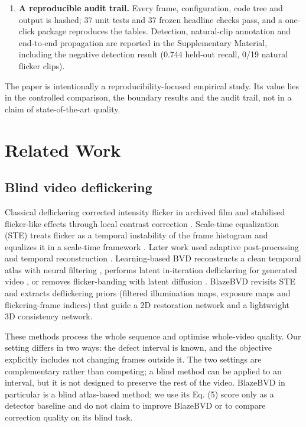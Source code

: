\documentclass[twocolumn,10pt]{svjour3}
\begin{document}
\begin{enumerate}
\item \textbf{A reproducible audit trail.} Every frame, configuration, code tree and output is hashed; 37 unit tests and 37 frozen headline checks pass, and a one-click package reproduces the tables. Detection, natural-clip annotation and end-to-end propagation are reported in the Supplementary Material, including the negative detection result (0.744 held-out recall, 0/19 natural flicker clips).
\end{enumerate}

The paper is intentionally a reproducibility-focused empirical study. Its value lies in the controlled comparison, the boundary results and the audit trail, not in a claim of state-of-the-art quality.


\section{Related Work}

\subsection{Blind video deflickering}

Classical deflickering corrected intensity flicker in archived film \cite{vanroosmalen1999correction} and stabilised flicker-like effects through local contrast correction \cite{delon2010stabilization}. Scale-time equalization (STE) treats flicker as a temporal instability of the frame histogram and equalizes it in a scale-time framework \cite{delon2006movie}. Later work used adaptive post-processing \cite{gandam2021efficient} and temporal reconstruction \cite{li2019video}. Learning-based BVD reconstructs a clean temporal atlas with neural filtering \cite{lei2023blind}, performs latent in-iteration deflickering for generated video \cite{duan2024diffsynth}, or removes flicker-banding with latent diffusion \cite{zhu2025rifle}. BlazeBVD \cite{qiu2024blazebvd} revisits STE and extracts deflickering priors (filtered illumination maps, exposure maps and flickering-frame indices) that guide a 2D restoration network and a lightweight 3D consistency network.


These methods process the whole sequence and optimise whole-video quality. Our setting differs in two ways: the defect interval is known, and the objective explicitly includes not changing frames outside it. The two settings are complementary rather than competing; a blind method can be applied to an interval, but it is not designed to preserve the rest of the video. BlazeBVD in particular is a blind atlas-based method; we use its Eq. (5) score only as a detector baseline and do not claim to improve BlazeBVD or to compare correction quality on its blind task.
\end{document}
